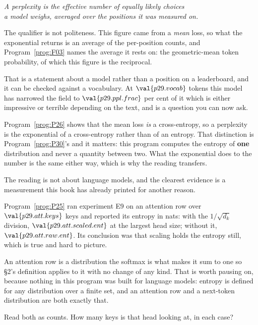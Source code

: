 \begin{fr}

\begin{center}
\emph{A perplexity is the effective number of equally likely choices\\
a model weighs, averaged over the positions it was measured on.}
\end{center}

The qualifier is not politeness. This figure came from a \emph{mean} loss, so
what the exponential returns is an average of the per-position counts, and
Program~\ref{prog:F03} names the average it rests on: the geometric-mean token
probability, of which this figure is the reciprocal.

That is a statement about a model rather than a position on a leaderboard, and
it can be checked against a vocabulary. At $\val{p29.vocab}$ tokens this model
has narrowed the field to $\val{p29.ppl.frac}$ per cent of it \dash{} which is
either impressive or terrible depending on the text, and is a question you can
now ask.

\begin{note}
Program~\ref{prog:P26} shows that the mean loss \emph{is} a cross-entropy, so
a perplexity is the exponential of a cross-entropy rather than of an entropy.
That distinction is Program~\ref{prog:P30}'s and it matters: this program
computes the entropy of \textbf{one} distribution and never a quantity between
two. What the exponential does to the number is the same either way, which is
why the reading transfers.
\end{note}
\end{fr}

\begin{fr}
The reading is not about language models, and the clearest evidence is a
measurement this book has already printed for another reason.

Program~\ref{prog:P25} ran experiment E9 on an attention row over
$\val{p29.att.keys}$ keys and reported its entropy in nats: with the
$1/\sqrt{d_k}$ division, $\val{p29.att.scaled.ent}$ at the largest
head size; without it, $\val{p29.att.raw.ent}$. Its conclusion was that
scaling holds the entropy still, which is true and hard to picture.

An attention row is a distribution \dash{} the softmax is what makes it sum
to one \dash{} so §2's definition applies to it with no change of any kind.
That is worth pausing on, because nothing in this program was built for
language models: entropy is defined for any distribution over a finite set,
and an attention row and a next-token distribution are both exactly that.

Read both as counts. How many keys is that head looking at, in each case?
\dotline
\nextframe
\end{fr}

